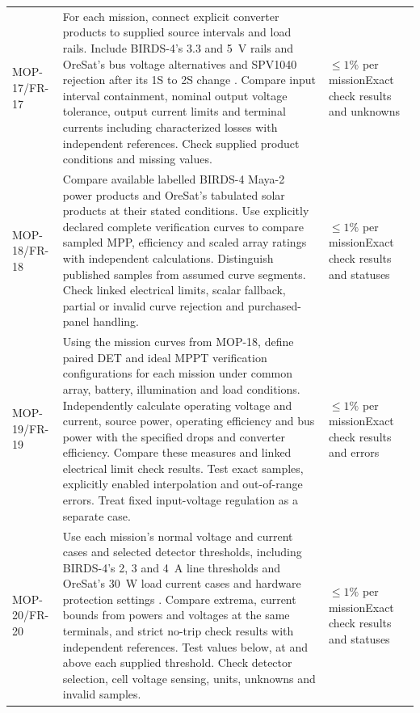 \begin{longtable}{@{}P{0.20\ReportTableBodyWidth}P{0.60\ReportTableBodyWidth}P{0.20\ReportTableBodyWidth}@{}}
MOP-17/FR-17 & For each mission, connect explicit converter products to supplied source intervals and load rails. Include BIRDS-4's 3.3 and 5~V rails \citep[Sec.~2.2.3]{shrestha2021birdssafety} and OreSat's bus voltage alternatives and SPV1040 rejection after its 1S to 2S change \citep{oresatbatteryresearch,oresatsolarhistory}. Compare input interval containment, nominal output voltage tolerance, output current limits and terminal currents including characterized losses with independent references. Check supplied product conditions and missing values. & $\leq 1\%$ per mission\newline Exact check results and unknowns \\
MOP-18/FR-18 & Compare available labelled BIRDS-4 Maya-2 power products \citep[Figs.~13--14]{shrestha2021birdssafety} and OreSat's tabulated solar products \citep{oresatsolarsweep} at their stated conditions. Use explicitly declared complete verification curves to compare sampled MPP, efficiency and scaled array ratings with independent calculations. Distinguish published samples from assumed curve segments. Check linked electrical limits, scalar fallback, partial or invalid curve rejection and purchased-panel handling. & $\leq 1\%$ per mission\newline Exact check results and statuses \\
MOP-19/FR-19 & Using the mission curves from MOP-18, define paired DET and ideal MPPT verification configurations for each mission under common array, battery, illumination and load conditions. Independently calculate operating voltage and current, source power, operating efficiency and bus power with the specified drops and converter efficiency. Compare these measures and linked electrical limit check results. Test exact samples, explicitly enabled interpolation and out-of-range errors. Treat fixed input-voltage regulation as a separate case. & $\leq 1\%$ per mission\newline Exact check results and errors \\
MOP-20/FR-20 & Use each mission's normal voltage and current cases and selected detector thresholds, including BIRDS-4's 2, 3 and 4~A line thresholds \citep[Sec.~6.3]{kyutech2021birdsicd} and OreSat's 30~W load current cases and hardware protection settings \citep{oresat2025batterydesign}. Compare extrema, current bounds from powers and voltages at the same terminals, and strict no-trip check results with independent references. Test values below, at and above each supplied threshold. Check detector selection, cell voltage sensing, units, unknowns and invalid samples. & $\leq 1\%$ per mission\newline Exact check results and statuses \\

\end{longtable}
